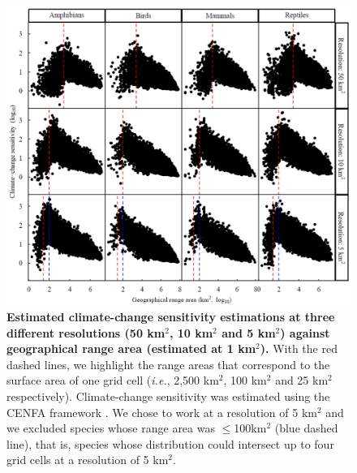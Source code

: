 \documentclass[11pt]{article}
\begin{document}

\begin{figure}[h!]
\centering
\includegraphics[scale=0.6]{Figures/CENFA_allres.png}
\caption[Estimated climate-change sensitivity estimations at three different resolutions]{\textbf{Estimated climate-change sensitivity estimations at three different resolutions (50 km$^2$, 10 km$^2$ and 5 km$^2$) against geographical range area (estimated at 1 km$^2$).} With the red dashed lines, we highlight the range areas that correspond to the surface area of one grid cell (\textit{i.e.}, 2,500 km$^2$, 100 km$^2$ and 25 km$^2$ respectively). Climate-change sensitivity was estimated using the CENFA framework \citep{Rinnan2019}. We chose to work at a resolution of 5 km$^2$ and we excluded species whose range area was $\leq$100km$^2$ (blue dashed line), that is, species whose distribution could intersect up to four grid cells at a resolution of 5 km$^2$.}
\label{SI_4_Figure7}
\end{figure}
\end{document}
